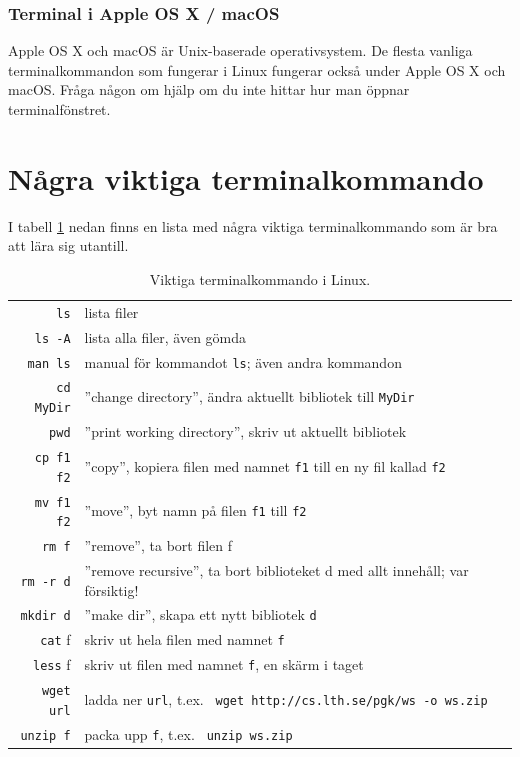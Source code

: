 \subsubsection{Terminal i Apple OS X / macOS}


Apple OS X och macOS är Unix-baserade operativsystem. De flesta vanliga terminalkommandon som fungerar i Linux fungerar också under Apple OS X och macOS. Fråga någon om hjälp om du inte hittar hur man öppnar terminalfönstret.



\section{Några viktiga terminalkommando}

I tabell \ref{fig:terminal:commands} nedan finns en lista med några viktiga terminalkommando som är bra att lära sig utantill.

\begin{table}[H]
\renewcommand{\arraystretch}{1.15}
\begin{tabular}{@{}r | l}
\texttt{ls} & lista filer \\
\texttt{ls -A} & lista alla filer, även gömda \\
\texttt{man ls} & manual för kommandot \texttt{ls}; även andra kommandon \\
\texttt{cd MyDir} & ''change directory'', ändra aktuellt bibliotek till \texttt{MyDir}\\
\texttt{pwd} & ''print working directory'', skriv ut aktuellt bibliotek \\
\texttt{cp f1 f2} & ''copy'', kopiera filen med namnet \texttt{f1} till en ny fil kallad \texttt{f2} \\
\texttt{mv f1 f2} & ''move'', byt namn på filen \texttt{f1} till \texttt{f2}  \\
\texttt{rm f} & ''remove'', ta bort filen f\\
\texttt{rm -r d} & ''remove recursive'', ta bort biblioteket d med allt innehåll; var försiktig!\\
\texttt{mkdir d} & ''make dir'', skapa ett nytt bibliotek \texttt{d}\\
\texttt{cat} f& skriv ut hela filen med namnet \texttt{f}\\
\texttt{less} f& skriv ut filen med namnet \texttt{f}, en skärm i taget\\
\texttt{wget url}&ladda ner \texttt{url}, t.ex. \texttt{ wget http://cs.lth.se/pgk/ws -o ws.zip}\\
\texttt{unzip f}&packa upp \texttt{f}, t.ex. \texttt{ unzip ws.zip}\\
\end{tabular}
    \caption{Viktiga terminalkommando i Linux.}
    \label{fig:terminal:commands}
\end{table}

